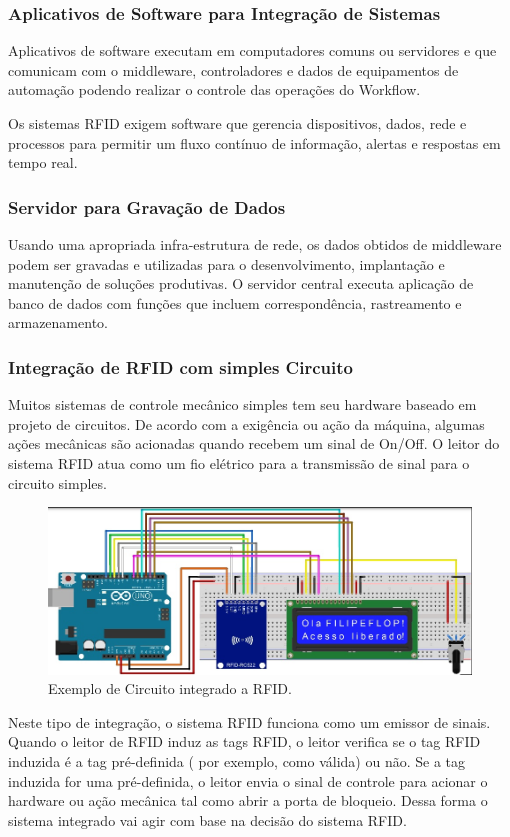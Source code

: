 \subsubsection{Aplicativos de Software para Integração de Sistemas}
Aplicativos de software executam em computadores comuns ou servidores e que comunicam com o middleware, controladores e dados de equipamentos de automação podendo realizar o controle das operações do Workflow.

		Os sistemas RFID exigem software que gerencia dispositivos, dados, rede e processos para permitir um fluxo contínuo de informação, alertas e respostas em tempo real.

		
\subsubsection{Servidor para Gravação de Dados}
	Usando uma apropriada infra-estrutura de rede, os dados obtidos de middleware podem ser gravadas e utilizadas para o desenvolvimento, implantação e manutenção de soluções produtivas. O servidor central executa aplicação de banco de dados com funções que incluem correspondência, rastreamento e armazenamento.


\subsubsection{Integração de RFID com simples Circuito}
Muitos sistemas de controle mecânico simples tem seu hardware baseado em projeto de circuitos. De acordo com a exigência ou ação da máquina, algumas ações mecânicas são acionadas quando recebem um sinal de On/Off. O leitor do sistema RFID atua como um fio elétrico para a transmissão de sinal para o circuito simples.


		\begin{figure}[h!]
			\centering
				\includegraphics[width=0.7\linewidth]{mosfet_rfid.jpg}
			\caption{Exemplo de Circuito integrado a RFID.}
			\label{fig:mosfet_rfid}
		\end{figure}
		

		Neste tipo de integração, o sistema RFID funciona como um emissor de sinais. Quando o leitor de RFID induz as tags RFID, o leitor verifica se o tag RFID induzida é a tag pré-definida ( por exemplo, como válida) ou não. Se a tag induzida for uma pré-definida, o leitor envia o sinal de controle para acionar o hardware ou ação mecânica tal como abrir a porta de bloqueio. Dessa forma o sistema integrado vai agir com base na decisão do sistema RFID.
		
